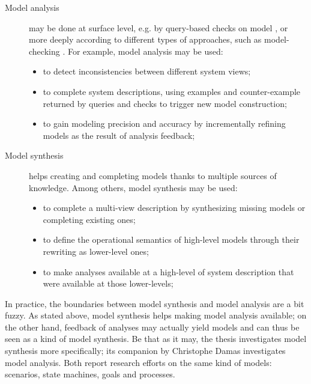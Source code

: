 \begin{description}

\item[Model analysis] may be done at surface level, e.g. by query-based checks on model \cite{VanLamsweerde:2009}, or more deeply according to different types of approaches, such as model-checking \cite{Clarke:1986, Queille:1982}. For example, model analysis may be used:

\begin{itemize}
\item to detect inconsistencies between different system views;
\item to complete system descriptions, using examples and counter-example returned by queries and checks to trigger new model construction;
\item to gain modeling precision and accuracy by incrementally refining models as the result of analysis feedback;
\end{itemize}

\item[Model synthesis] helps creating and completing models thanks to multiple sources of knowledge. Among others, model synthesis may be used:

\begin{itemize}
\item to complete a multi-view description by synthesizing missing models or completing existing ones;
\item to define the operational semantics of high-level models through their rewriting as lower-level ones;
\item to make analyses available at a high-level of system description that were available at those lower-levels;
\end{itemize}

\end{description}

In practice, the boundaries between model synthesis and model analysis are a bit fuzzy. As stated above, model synthesis helps making model analysis available; on the other hand, feedback of analyses may actually yield models and can thus be seen as a kind of model synthesis. Be that as it may, the thesis investigates model synthesis more specifically; its companion by Christophe Damas \cite{Damas:2011} investigates model analysis. Both report research efforts on the same kind of models: scenarios, state machines, goals and processes.


